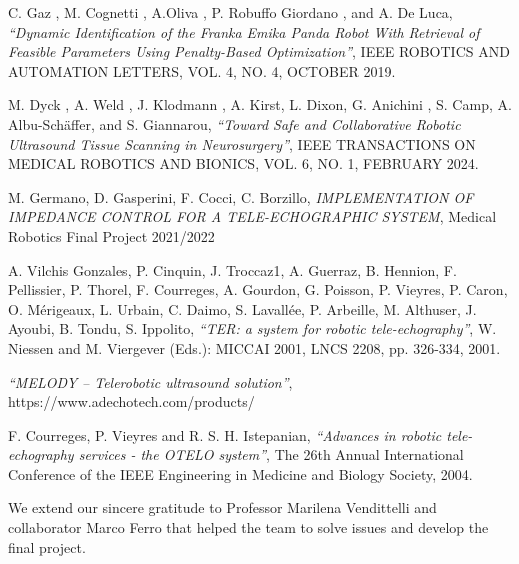 \documentclass{article}
\begin{document}
\begin{thebibliography}{9}

  C. Gaz , M. Cognetti , A.Oliva ,
P. Robuffo Giordano , and A. De Luca,
  \emph{“Dynamic Identification of the Franka Emika Panda
Robot With Retrieval of Feasible Parameters
Using Penalty-Based Optimization”},
   IEEE ROBOTICS AND AUTOMATION LETTERS, VOL. 4, NO. 4, OCTOBER 2019.
   
 M. Dyck , A. Weld , J. Klodmann , A. Kirst, L. Dixon, G. Anichini ,
S. Camp, A. Albu-Schäffer, and S. Giannarou,
  \emph{“Toward Safe and Collaborative Robotic Ultrasound
Tissue Scanning in Neurosurgery”},
  IEEE TRANSACTIONS ON MEDICAL ROBOTICS AND BIONICS, VOL. 6, NO. 1, FEBRUARY 2024.
  
  M. Germano, D. Gasperini, F. Cocci, C. Borzillo,
  \emph{IMPLEMENTATION OF IMPEDANCE
CONTROL FOR A TELE-ECHOGRAPHIC SYSTEM},
Medical Robotics Final Project 2021/2022

A. Vilchis Gonzales, P. Cinquin, J. Troccaz1, A. Guerraz, B. Hennion, F. Pellissier, P. Thorel, F.
Courreges, A. Gourdon, G. Poisson, P. Vieyres, P. Caron, O. Mérigeaux, L. Urbain, C. Daimo,
S. Lavallée, P. Arbeille, M. Althuser, J. Ayoubi, B. Tondu, S. Ippolito,
  \emph{“TER: a system for robotic tele-echography”},
  W. Niessen and M. Viergever (Eds.): MICCAI 2001, LNCS 2208, pp. 326-334, 2001.
  
 \emph{“MELODY – Telerobotic ultrasound solution”},
 https://www.adechotech.com/products/
  
F. Courreges, P. Vieyres and R. S. H. Istepanian,
  \emph{“Advances in robotic tele-echography services - the OTELO system”},
The 26th Annual International Conference of the IEEE Engineering in Medicine and Biology Society, 2004.
\end{thebibliography}
\vspace{2cm}
We extend our sincere gratitude to Professor Marilena Vendittelli and collaborator Marco Ferro that helped the team to solve issues and develop the final project.
\end{document}
